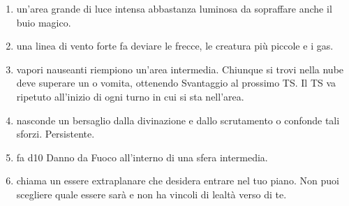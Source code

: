 \documentclass[itdr]{subfiles}
\begin{document}
\begin{enumerate}
	\item {} un'area grande di luce intensa abbastanza luminosa da sopraffare anche il buio magico.
	\item {} una linea di vento forte fa deviare le frecce, le creatura più piccole e i gas.
	\item {} vapori nauseanti riempiono un'area intermedia. Chiunque si trovi nella nube deve superare un  o vomita, ottenendo Svantaggio al prossimo TS. Il TS va ripetuto all'inizio di ogni turno in cui si sta nell'area.
	\item {} nasconde un bersaglio dalla \mbox{divinazione} e dallo scrutamento o confonde tali sforzi. \mbox{Persistente.}
	\item {} fa d10 Danno da Fuoco all'interno di una sfera intermedia.
	\item {} chiama un essere extraplanare che desidera entrare nel tuo piano. Non puoi scegliere quale essere sarà e non ha vincoli di lealtà verso di te.

\vfill
\break


\end{enumerate}
\end{document}
